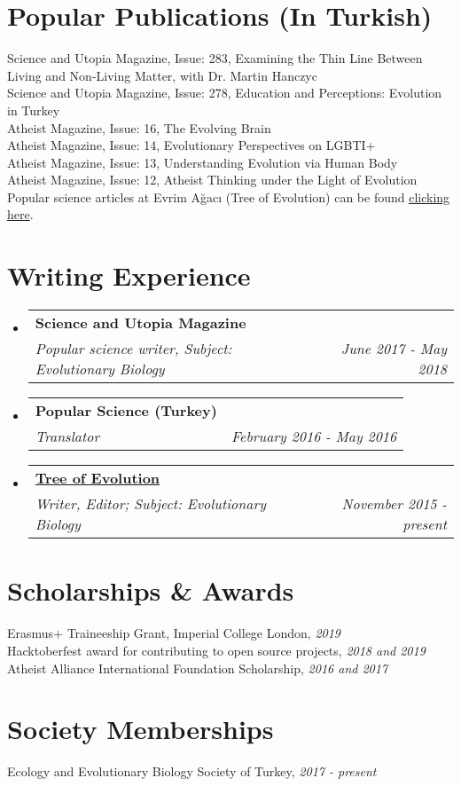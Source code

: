 \documentclass[letterpaper,11pt]{article}
\makeatletter
\newcommand{\resumeSubheading}[4]{
  \vspace{-1pt}\item
    \begin{tabular*}{0.97\textwidth}{l@{\extracolsep{\fill}}r}
      \textbf{#1} & #2 \\
      \textit{\small#3} & \textit{\small #4} \\
    \end{tabular*}\vspace{-5pt}
}
\newcommand{\resumeSubHeadingListStart}{\begin{itemize}[leftmargin=*]}
\newcommand{\resumeSubHeadingListEnd}{\end{itemize}}
\makeatother
\begin{document}
\section{Popular Publications (In Turkish)}
Science and Utopia Magazine, Issue: 283, Examining the Thin Line Between Living and Non-Living Matter, with Dr. Martin Hanczyc \\
Science and Utopia Magazine, Issue: 278, Education and Perceptions: Evolution in Turkey \\
Atheist Magazine, Issue: 16, The Evolving Brain \\
Atheist Magazine, Issue: 14, Evolutionary Perspectives on LGBTI+ \\
Atheist Magazine, Issue: 13, Understanding Evolution via Human Body \\
Atheist Magazine, Issue: 12, Atheist Thinking under the Light of Evolution \\
Popular science articles at Evrim A\u{g}ac{\i} (Tree of Evolution) can be found  \href{https://evrimagaci.org/isinaltinkaya/}{clicking here}. 

\section{Writing Experience}
  \resumeSubHeadingListStart
    \resumeSubheading
      {Science and Utopia Magazine}{ }
      {Popular science writer, Subject: Evolutionary Biology}{June 2017 - May 2018}
    \resumeSubheading
      {Popular Science (Turkey)}{ }
      {Translator}{February 2016 - May 2016}
    \resumeSubheading
      {\href{https://evrimagaci.org/isinaltinkaya/}{Tree of Evolution}}{}
      {Writer, Editor; Subject: Evolutionary Biology}{November 2015 - present}
  \resumeSubHeadingListEnd


\section{Scholarships \& Awards}
Erasmus+ Traineeship Grant, Imperial College London, \textit{2019} \\
Hacktoberfest award for contributing to open source projects, \textit{2018 and 2019} \\
Atheist Alliance International Foundation Scholarship, \textit{2016 and 2017} \\


\section{Society Memberships}	
Ecology and Evolutionary Biology Society of Turkey, \textit{2017 - present} \\
\end{document}
